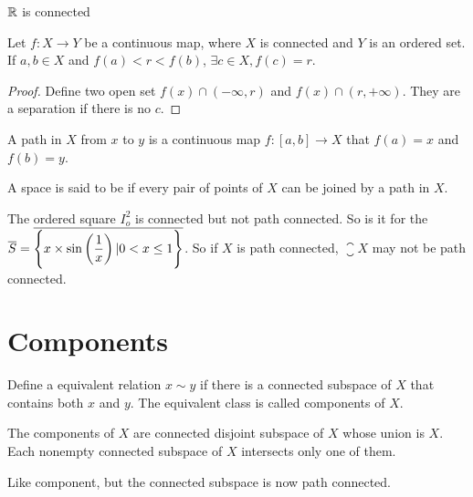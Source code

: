 \begin{theorem}
    $\mathbb{R}$ is connected
\end{theorem}

\begin{theorem}
    Let $f : X \rightarrow Y$ be a continuous map, where $X$ is connected and $Y$ is an ordered set. If $a,b \in X$ and $f(a) < r < f(b)$, $\exists c \in X, f(c) = r$.
\end{theorem}
\begin{proof}
    Define two open set $f(x) \cap (-\infty, r)$ and $f(x) \cap (r, +\infty)$. They are a separation if there is no $c$.
\end{proof}

\begin{definition}
    A path in $X$ from $x$ to $y$ is a continuous map $f: [a,b] \rightarrow X$ that $f(a) = x$ and $f(b) = y$.
    
    A space is said to be  if every pair of points of $X$ can be joined by a path in $X$.
\end{definition}

\begin{example}
    The ordered square $I_o^2$ is connected but not path connected. So is it for the  $\overline{S} = \overline{\set{\displaystyle x \times \sin \left(\frac{1}{x} \right) | 0 < x \leq 1}}$. So if $X$ is path connected, $\closure{X}$ may not be path connected.
\end{example}


\section{Components}

\begin{definition}
    Define a equivalent relation $x \sim y$ if there is a connected subspace of $X$ that contains both $x$ and $y$. The equivalent class is called components of $X$.
\end{definition}

\begin{theorem}
The components of $X$ are connected disjoint subspace of $X$ whose union is $X$. Each nonempty connected subspace of $X$ intersects only one of them.    
\end{theorem}

\begin{definition}
    Like component, but the connected subspace is now path connected.
\end{definition}

